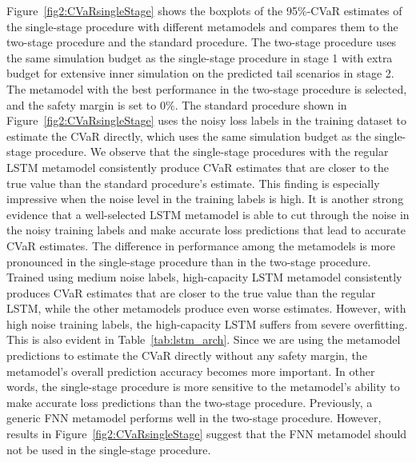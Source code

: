 Figure~\ref{fig2:CVaRsingleStage} shows the boxplots of the 95\%-CVaR estimates of the single-stage procedure with different metamodels and compares them to the two-stage procedure and the standard procedure.
The two-stage procedure uses the same simulation budget as the single-stage procedure in stage 1 with extra budget for extensive inner simulation on the predicted tail scenarios in stage 2.
The metamodel with the best performance in the two-stage procedure is selected, and the safety margin is set to $0\%$.
The standard procedure shown in Figure~\ref{fig2:CVaRsingleStage} uses the noisy loss labels in the training dataset to estimate the CVaR directly, which uses the same simulation budget as the single-stage procedure.
We observe that the single-stage procedures with the regular LSTM metamodel consistently produce CVaR estimates that are closer to the true value than the standard procedure's estimate.
This finding is especially impressive when the noise level in the training labels is high.
It is another strong evidence that a well-selected LSTM metamodel is able to cut through the noise in the noisy training labels and make accurate loss predictions that lead to accurate CVaR estimates.
The difference in performance among the metamodels is more pronounced in the single-stage procedure than in the two-stage procedure.
Trained using medium noise labels, high-capacity LSTM metamodel consistently produces CVaR estimates that are closer to the true value than the regular LSTM, while the other metamodels produce even worse estimates.
However, with high noise training labels, the high-capacity LSTM suffers from severe overfitting. 
This is also evident in Table~\ref{tab:lstm_arch}.
Since we are using the metamodel predictions to estimate the CVaR directly without any safety margin, the metamodel's overall prediction accuracy becomes more important.
In other words, the single-stage procedure is more sensitive to the metamodel's ability to make accurate loss predictions than the two-stage procedure.
Previously, a generic FNN metamodel performs well in the two-stage procedure. 
However, results in Figure~\ref{fig2:CVaRsingleStage} suggest that the FNN metamodel should not be used in the single-stage procedure.

